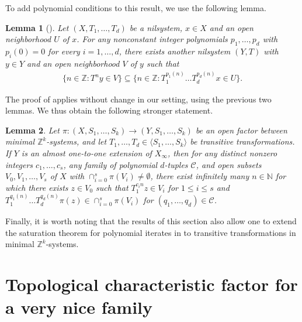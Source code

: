 \documentclass[11pt,reqno]{amsart}
\newcommand{\Z}{\mathbb{Z}}
\newcommand{\N}{\mathbb{N}}
\newcommand{\cC}{{\mathcal C}}
\newtheorem{lemma}[lemma]{Lemma}
\theoremstyle{definition}
\theoremstyle{remark}
\begin{document}
To add polynomial conditions to this result, we use the following lemma.

\begin{lemma}[{\cite[Proposition 3.14]{Leibman05a}}]
    Let $(X,T_1,\dots,T_d)$ be a nilsystem, $x\in X$ and an open neighborhood $U$ of $x$. For any nonconstant integer polynomials $p_1,\dots,p_d$ with $p_i(0)=0$ for every $i=1,\dots,d$, there exists another nilsystem $(Y,T)$ with $y\in Y$ and an open neighborhood $V$ of $y$ such that\begin{align*}
        \{n\in \Z: T^n y\in V\} \subseteq\{n\in\Z: T_1^{p_1(n)}\dots T_d^{p_d(n)}x\in U\}.
    \end{align*}
\end{lemma}

The proof of {\cite[Lemma 4.3]{Qiu_poly_orbits_tot_minimal:2023}} applies without change in our setting, using the previous two lemmas. We thus obtain the following stronger statement. 

\begin{lemma}\label{lemma: linear stronger}
    Let $\pi\colon (X,S_{1},\dots,S_{k})\to (Y,S_1,\dots,S_k)$ be an open factor between minimal $\Z^{k}$-systems, and let $T_1,\dots,T_d\in \langle S_{1},\dots,S_{k}\rangle$ be transitive transformations. If $Y$ is an almost one-to-one extension of $X_\infty$, then for any distinct nonzero integers $c_1,\dots, c_s$, any family of polynomial $d$-tuples $\cC$, and open subsets $V_0,V_1,\dots,V_s$ of $X$ with $\cap_{i=0}^{s}\pi(V_i)\neq \emptyset$, there exist infinitely many $n\in \N$ for which there exists $z\in V_0$ such that $T_1^{c_i n}z\in V_i$ for $1\leq i \leq s$ and $T_1^{q_1(n)}\dots T_d^{q_d(n)}\pi(z)\in \cap_{i=0}^{s}\pi(V_i)$ for $(q_1,\dots,q_d)\in \cC$.
\end{lemma}

Finally, it is worth noting that the results of this section also allow one to extend the saturation theorem for polynomial iterates in \cite{Qiu_poly_orbits_tot_minimal:2023,Ye_Yu_polynomial_saturation:2025} to transitive transformations in minimal $\Z^k$-systems.

\section{Topological characteristic factor for a very nice family}
\end{document}
